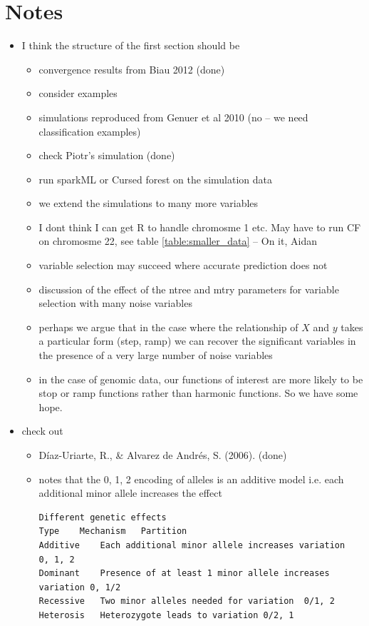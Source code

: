 \documentclass[10pt,a4paper]{article}  %
\begin{document}
\section{Notes}
\begin{itemize}
\item   I think the structure of the first section should be
  \begin{itemize}
  \item  convergence results from Biau 2012  (done)
  \item consider  \cite{Segal.2004} examples
  \item simulations reproduced from Genuer et al 2010 (no -- we need classification examples)
  \item check Piotr's simulation  (done)
  \item run sparkML or Cursed forest on the  simulation data 
  \item we extend the simulations to many more variables 
  \item I dont think I can get R to handle chromosme 1 etc. May have to run CF on chromosme 22, see table
    \ref{table:smaller_data} -- On it, Aidan
  \item variable  selection may succeed where accurate prediction does not
  \item discussion of the effect of the ntree and mtry parameters for variable selection with many noise variables
  \item   perhaps we argue that in the case where the relationship of $X$ and $y$ takes a particular form (step, ramp) we can recover
    the significant variables in the presence of a very large number of noise variables
  \item in the case of genomic data, our functions of interest are more likely to be stop or ramp functions rather than harmonic
    functions. So we have some hope.
  \end{itemize}
\item check out 
  \begin{itemize}
  \item D\'iaz-Uriarte, R., \& Alvarez de Andr\'es, S. (2006). (done)
  \item \cite{Goldstein.et.al.2011}
notes that the 0, 1, 2 encoding of alleles is an additive model i.e. each additional minor allele increases the effect 
\begin{verbatim}
Different genetic effects
Type	Mechanism	Partition
Additive	Each additional minor allele increases variation	0, 1, 2
Dominant	Presence of at least 1 minor allele increases variation	0, 1/2
Recessive	Two minor alleles needed for variation	0/1, 2
Heterosis	Heterozygote leads to variation	0/2, 1
\end{verbatim}


\end{itemize}
\end{itemize}
\end{document}
